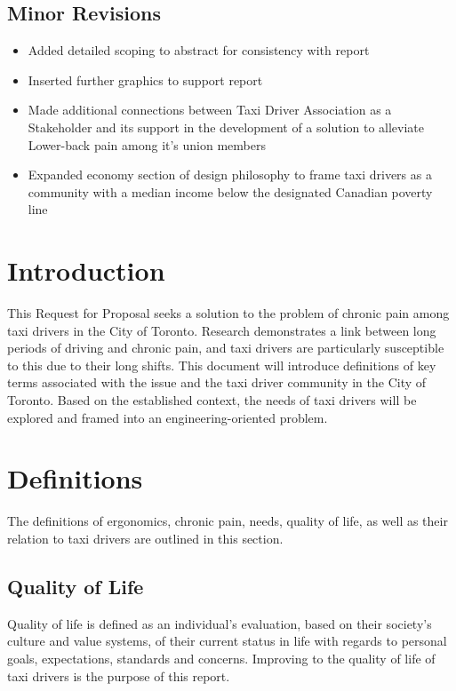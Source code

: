 \documentclass[11pt]{article}
\begin{document}
\subsection{Minor Revisions}
\label{sec:minor revisions} 
\begin{itemize}
\item Added detailed scoping to abstract for consistency with report 
\item Inserted further graphics to support report
\item Made additional connections between Taxi Driver Association as a
Stakeholder and its support in the development of a solution to alleviate
Lower-back pain among it’s union members 
\item Expanded economy section of design philosophy to frame taxi drivers as a  community with a median income below the designated Canadian poverty line 
\end{itemize}
\section{Introduction}
\label{sec:intro}
This Request for Proposal seeks a solution to the problem of chronic
pain among taxi drivers in the City of Toronto. Research demonstrates a
link between long periods of driving and chronic pain\cite{KneePain,
Okunribido2008}, and taxi drivers are particularly susceptible to this
due to their long shifts\cite{thestar2012, KneePain}. This document will introduce
definitions of key terms associated with the issue and the taxi driver community
in the City of Toronto. Based on the established context, the needs of taxi drivers
will be explored and framed into an engineering-oriented problem. 

\section{Definitions}
\label{sec:defs}
The definitions of ergonomics, chronic pain, needs, quality of life, as
well as their relation to taxi drivers are outlined in this section.

\subsection{Quality of Life}
\label{sec:lifequal}

Quality of life is defined as an individual's evaluation, based on
their society's culture and value systems, of their current status in
life with regards to personal goals, expectations, standards and
concerns\cite{WHO}. Improving to the quality of life of taxi drivers is the
purpose of this report.
\end{document}
